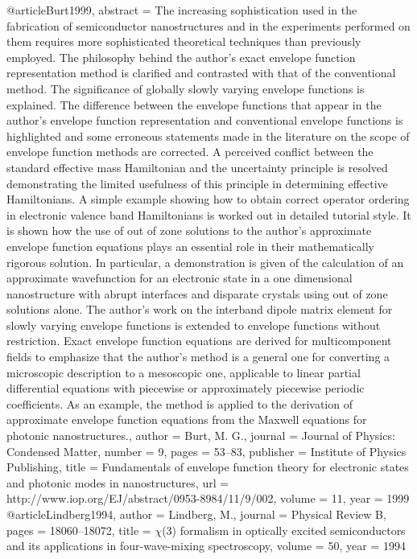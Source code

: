 @article{Burt1999,
abstract = {The increasing sophistication used in the fabrication of semiconductor nanostructures and in the experiments performed on them requires more sophisticated theoretical techniques than previously employed. The philosophy behind the author's exact envelope function representation method is clarified and contrasted with that of the conventional method. The significance of globally slowly varying envelope functions is explained. The difference between the envelope functions that appear in the author's envelope function representation and conventional envelope functions is highlighted and some erroneous statements made in the literature on the scope of envelope function methods are corrected. A perceived conflict between the standard effective mass Hamiltonian and the uncertainty principle is resolved demonstrating the limited usefulness of this principle in determining effective Hamiltonians. A simple example showing how to obtain correct operator ordering in electronic valence band Hamiltonians is worked out in detailed tutorial style. It is shown how the use of out of zone solutions to the author's approximate envelope function equations plays an essential role in their mathematically rigorous solution. In particular, a demonstration is given of the calculation of an approximate wavefunction for an electronic state in a one dimensional nanostructure with abrupt interfaces and disparate crystals using out of zone solutions alone. The author's work on the interband dipole matrix element for slowly varying envelope functions is extended to envelope functions without restriction. Exact envelope function equations are derived for multicomponent fields to emphasize that the author's method is a general one for converting a microscopic description to a mesoscopic one, applicable to linear partial differential equations with piecewise or approximately piecewise periodic coefficients. As an example, the method is applied to the derivation of approximate envelope function equations from the Maxwell equations for photonic nanostructures.},
author = {Burt, M. G.},
journal = {Journal of Physics: Condensed Matter},
number = {9},
pages = {53–83},
publisher = {Institute of Physics Publishing},
title = {{Fundamentals of envelope function theory for electronic states and photonic modes in nanostructures}},
url = {http://www.iop.org/EJ/abstract/0953-8984/11/9/002},
volume = {11},
year = {1999}
}
@article{Lindberg1994,
author = {Lindberg, M.},
journal = {Physical Review B},
pages = {18060--18072},
title = {$\chi$(3) formalism in optically excited semiconductors and its applications in four-wave-mixing spectroscopy},
volume = {50},
year = {1994}
}
